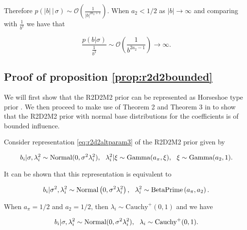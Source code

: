 Therefore $p\left( |b| \,|\,\sigma \right)\sim \mathcal{O} \left(  \frac{1}{ |b|^{2a_2+1}}\right)$. When $a_2< 1/2$ as $|b|\to \infty$ and comparing with $\frac{1}{b^2}$ we have that

\[ \frac{p(b|\sigma)}{ \frac{1}{b^2} } \sim \mathcal{O} \left( \frac{ 1 }{ b^{2a_2-1}  } \right)      \to \infty  . \]

\subsection*{Proof of proposition \ref{prop:r2d2bounded}}

We will first show that the R2D2M2 prior can be represented as Horseshoe type prior \citep{Horseshoe}. We then proceed to make use of Theorem 2 and Theorem 3 in \cite{Horseshoe} to show that the R2D2M2 prior with normal base distributions for the coefficients is of bounded influence.

Consider representation \eqref{eq:r2d2altparam3} of the R2D2M2 prior given by

\begin{align*}
    b_i | \sigma, \lambda_i^2 \sim \text{Normal}(0, \sigma^2 \lambda_i^2), \ \
    \lambda_i^2 | \xi \sim \text{Gamma}(a_\pi, \xi), \ \  \xi \sim \text{Gamma}(a_2,1).
\end{align*}

It can be shown that this representation is equivalent to

	\begin{align*}
		b_{i} |  \sigma^2, \lambda_{i}^2 \sim \text{Normal} \left( 0, \sigma^2 \lambda_i^2 \right), \ \ \lambda_{i}^2 \sim \text{BetaPrime} \left( a_\pi, a_2 \right).
	\end{align*}

When $a_\pi=1/2$ and $a_2=1/2$, then $\lambda_i \sim \text{Cauchy}^+(0,1)$ and we have

\begin{align*}
        b_i | \sigma, \lambda_i^2 \sim \text{Normal}(0, \sigma^2 \lambda_i^2), \ \
        \lambda_i \sim \text{Cauchy}^+(0,1).
\end{align*}

